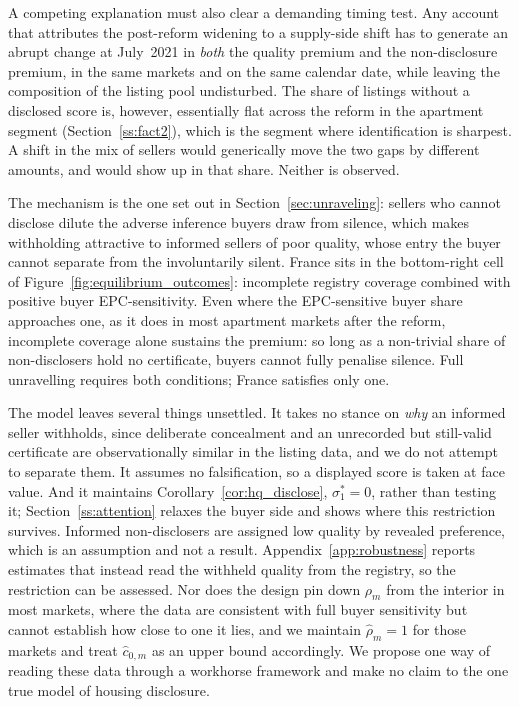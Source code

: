 A competing explanation must also clear a demanding timing test. Any account that attributes
the post-reform widening to a supply-side shift has to generate an abrupt change at
July~2021 in \emph{both} the quality premium and the non-disclosure premium, in the same
markets and on the same calendar date, while leaving the composition of the listing pool
undisturbed. The share of listings without a disclosed score is, however, essentially flat
across the reform in the apartment segment (Section~\ref{ss:fact2}), which is the segment
where identification is sharpest. A shift in the mix of sellers would generically move the
two gaps by different amounts, and would show up in that share. Neither is observed.

The mechanism is the one set out in Section~\ref{sec:unraveling}: sellers who cannot
disclose dilute the adverse inference buyers draw from silence, which makes withholding
attractive to informed sellers of poor quality, whose entry the buyer cannot separate from
the involuntarily silent. France sits in the bottom-right cell of
Figure~\ref{fig:equilibrium_outcomes}: incomplete registry coverage combined with positive
buyer EPC-sensitivity. Even where the EPC-sensitive buyer share approaches one, as it does in
most apartment markets after the reform, incomplete coverage alone sustains the premium: so long as a non-trivial share of non-disclosers hold no certificate, buyers cannot fully
penalise silence. Full unravelling requires both conditions; France satisfies only one.

The model leaves several things unsettled. It takes no stance on
\emph{why} an informed seller withholds, since deliberate concealment and an unrecorded but
still-valid certificate are observationally similar in the listing data, and we do not
attempt to separate them. It assumes no falsification, so a displayed score is taken at face
value. And it maintains Corollary~\ref{cor:hq_disclose}, $\sigma_1^*=0$, rather than testing
it; Section~\ref{ss:attention} relaxes the buyer side and shows where this restriction survives. Informed non-disclosers are assigned low quality by revealed preference, which is an
assumption and not a result. Appendix~\ref{app:robustness} reports estimates that instead read
the withheld quality from the registry, so the restriction can be assessed. Nor does the
design pin down $\rho_m$ from the interior in most markets, where the data are consistent with full
buyer sensitivity but cannot establish how close to one it lies, and we maintain
$\hat\rho_m = 1$ for those markets and treat $\hat c_{0,m}$ as an upper bound accordingly. We
propose one way of reading these data through a workhorse framework and make no claim to the one true model of housing disclosure.

